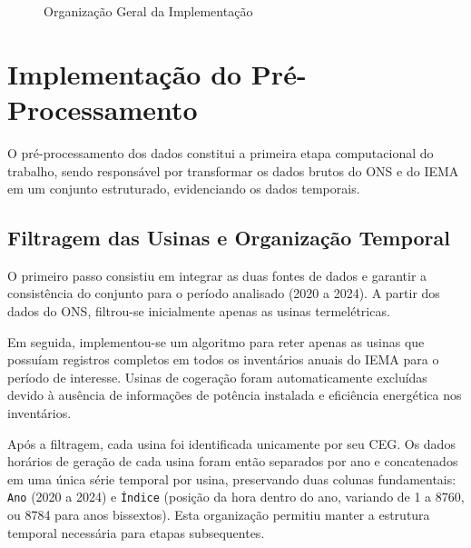 \begin{figure}[H]
    \caption{Organização Geral da Implementação}
    \label{fig:organizacao_implementacao}
\end{figure}

\section{Implementação do Pré-Processamento}

O pré-processamento dos dados constitui a primeira etapa computacional do trabalho, sendo responsável por transformar os dados brutos do \ac{ONS} e do \ac{IEMA} em um conjunto estruturado, evidenciando os dados temporais.

\subsection{Filtragem das Usinas e Organização Temporal}

O primeiro passo consistiu em integrar as duas fontes de dados e garantir a consistência do conjunto para o período analisado (2020 a 2024). A partir dos dados do \ac{ONS}, filtrou-se inicialmente apenas as usinas termelétricas.

Em seguida, implementou-se um algoritmo para reter apenas as usinas que possuíam registros completos em todos os inventários anuais do \ac{IEMA} para o período de interesse. Usinas de cogeração foram automaticamente excluídas devido à ausência de informações de potência instalada e eficiência energética nos inventários.

Após a filtragem, cada usina foi identificada unicamente por seu \ac{CEG}. Os dados horários de geração de cada usina foram então separados por ano e concatenados em uma única série temporal por usina, preservando duas colunas fundamentais: \texttt{Ano} (2020 a 2024) e \texttt{Índice} (posição da hora dentro do ano, variando de 1 a 8760, ou 8784 para anos bissextos). Esta organização permitiu manter a estrutura temporal necessária para etapas subsequentes.

